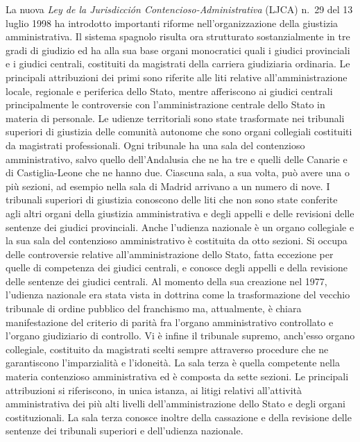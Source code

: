 \documentclass[12pt,it,a4paper,]{report}
\begin{document}
La nuova \emph{Ley de la Jurisdicción Contencioso-Administrativa} (LJCA)
n.~29 del 13 luglio 1998 ha introdotto importanti riforme
nell'organizzazione della giustizia amministrativa. Il sistema spagnolo
risulta ora strutturato sostanzialmente in tre gradi di giudizio ed ha
alla sua base organi monocratici quali i giudici provinciali e i giudici
centrali, costituiti da magistrati della carriera giudiziaria ordinaria.
Le principali attribuzioni dei primi sono riferite alle liti relative
all'amministrazione locale, regionale e periferica dello Stato, mentre
afferiscono ai giudici centrali principalmente le controversie con
l'amministrazione centrale dello Stato in materia di personale. Le
udienze territoriali sono state trasformate nei tribunali superiori di
giustizia delle comunità autonome che sono organi collegiali costituiti
da magistrati professionali. Ogni tribunale ha una sala del contenzioso
amministrativo, salvo quello dell'Andalusia che ne ha tre e quelli delle
Canarie e di Castiglia-Leone che ne hanno due. Ciascuna sala, a sua
volta, può avere una o più sezioni, ad esempio nella sala di Madrid
arrivano a un numero di nove. I tribunali superiori di giustizia
conoscono delle liti che non sono state conferite agli altri organi
della giustizia amministrativa e degli appelli e delle revisioni delle
sentenze dei giudici provinciali. Anche l'udienza nazionale è un organo
collegiale e la sua sala del contenzioso amministrativo è costituita da
otto sezioni. Si occupa delle controversie relative all'amministrazione
dello Stato, fatta eccezione per quelle di competenza dei giudici
centrali, e conosce degli appelli e della revisione delle sentenze dei
giudici centrali. Al momento della sua creazione nel 1977, l'udienza
nazionale era stata vista in dottrina come la trasformazione del vecchio
tribunale di ordine pubblico del franchismo ma, attualmente, è chiara
manifestazione del criterio di parità fra l'organo amministrativo
controllato e l'organo giudiziario di controllo. Vi è infine il
tribunale supremo, anch'esso organo collegiale, costituito da magistrati
scelti sempre attraverso procedure che ne garantiscono l'imparzialità e
l'idoneità. La sala terza è quella competente nella materia contenzioso
amministrativa ed è composta da sette sezioni. Le principali
attribuzioni si riferiscono, in unica istanza, ai litigi relativi
all'attività amministrativa dei più alti livelli dell'amministrazione
dello Stato e degli organi costituzionali. La sala terza conosce inoltre
della cassazione e della revisione delle sentenze dei tribunali
superiori e dell'udienza nazionale.
\end{document}
